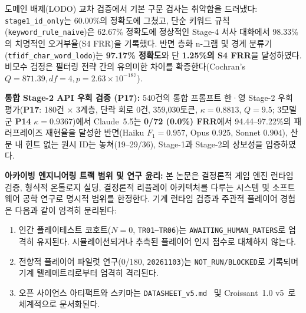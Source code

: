 도메인 배제(LODO) 교차 검증에서 기본 구문 검사는 취약함을 드러냈다: \texttt{stage1\_id\_only}는 60.00\%의 정확도에 그쳤고, 단순 키워드 규칙(\texttt{keyword\_rule\_naive})은 62.67\% 정확도에 정상적인 Stage-4 서사 대화에서 98.33\%의 치명적인 오거부율(S4 FRR)을 기록했다. 반면 층화 n-그램 및 경계 분류기(\texttt{tfidf\_char\_word\_lodo})는 \textbf{97.17\% 정확도}와 단 \textbf{1.25\%의 S4 FRR}을 달성하였다. 비모수 검정은 필터링 전략 간의 유의미한 차이를 확증한다(Cochran's $Q = 871.39, df=4, p = 2.63 \times 10^{-187}$).

\textbf{통합 Stage-2 API 우회 검증 (\textbf{P17}):} 540건의 통합 프롬프트 한·영 Stage-2 우회 평가(\textbf{P17}: 180건 $\times$ 3계층, 단락 회로 0건, 359,030토큰, $\kappa{=}0.8813$, $Q{=}9.5$; 3모델군 \textbf{P14} $\kappa{=}0.9367$)에서 Claude~5.5는 \textbf{0/72 (0.0\%) FRR}에서 94.44--97.22\%의 패러프레이즈 재현율을 달성한 반면(Haiku $F_1{=}0.957$, Opus $0.925$, Sonnet $0.904$), 산문 내 힌트 없는 원시 ID는 놓쳐(19--29/36), Stage-1과 Stage-2의 상보성을 입증하였다.

\textbf{아카이빙 엔지니어링 트랙 범위 및 연구 윤리:} 본 논문은 결정론적 게임 엔진 런타임 검증, 형식적 온톨로지 실딩, 결정론적 리플레이 아키텍처를 다루는 시스템 및 소프트웨어 공학 연구로 명시적 범위를 한정한다. 기계 런타임 검증과 주관적 플레이어 경험은 다음과 같이 엄격히 분리된다:
\begin{enumerate}
    \item 인간 플레이테스트 코호트($N{=}0$, \texttt{TR01--TR06})는 \texttt{AWAITING\_HUMAN\_RATERS}로 엄격히 유지된다. 시뮬레이션되거나 추측된 플레이어 인지 점수로 대체하지 않는다.
    \item 전향적 플레이어 파일럿 연구(0/180, \texttt{20261103})는 \texttt{NOT\_RUN/BLOCKED}로 기록되며 기계 텔레메트리로부터 엄격히 격리된다.
    \item 오픈 사이언스 아티팩트와 스키마는 \texttt{DATASHEET\_v5.md}~\cite{gebru2021datasheets} 및 Croissant~1.0 v5~\cite{akhtar2024croissant}로 체계적으로 문서화된다.
\end{enumerate}
